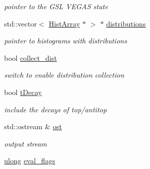 \begin{DoxyCompactItemize}
\begin{DoxyCompactList}\small\item\em pointer to the G\-S\-L V\-E\-G\-A\-S state \end{DoxyCompactList}\item 
\hypertarget{classintegrand__par_a64a87fc85afba50f419677de01b2c44c}{std\-::vector$<$ \hyperlink{classHistArray}{Hist\-Array} $\ast$ $>$ $\ast$ \hyperlink{classintegrand__par_a64a87fc85afba50f419677de01b2c44c}{distributions}}\label{classintegrand__par_a64a87fc85afba50f419677de01b2c44c}

\begin{DoxyCompactList}\small\item\em pointer to histograms with distributions \end{DoxyCompactList}\item 
\hypertarget{classintegrand__par_a2227f484c28e54b55769b2fe6911a782}{bool \hyperlink{classintegrand__par_a2227f484c28e54b55769b2fe6911a782}{collect\-\_\-dist}}\label{classintegrand__par_a2227f484c28e54b55769b2fe6911a782}

\begin{DoxyCompactList}\small\item\em switch to enable distribution collection \end{DoxyCompactList}\item 
\hypertarget{classintegrand__par_a725bfa73c797c38c5575594d0ff53eb6}{bool \hyperlink{classintegrand__par_a725bfa73c797c38c5575594d0ff53eb6}{t\-Decay}}\label{classintegrand__par_a725bfa73c797c38c5575594d0ff53eb6}

\begin{DoxyCompactList}\small\item\em include the decays of top/antitop \end{DoxyCompactList}\item 
\hypertarget{classintegrand__par_ab817e73577da97cd660ad01761521d3b}{std\-::ostream \& \hyperlink{classintegrand__par_ab817e73577da97cd660ad01761521d3b}{ost}}\label{classintegrand__par_ab817e73577da97cd660ad01761521d3b}

\begin{DoxyCompactList}\small\item\em output stream \end{DoxyCompactList}\item 
\hypertarget{classintegrand__par_adb701c9d21e3b412032dca85ebcde090}{\hyperlink{Global_8h_a1398ea0e48e059bf4db2f4bcd7eb31fa}{ulong} \hyperlink{classintegrand__par_adb701c9d21e3b412032dca85ebcde090}{eval\-\_\-flags}}\label{classintegrand__par_adb701c9d21e3b412032dca85ebcde090}


\end{DoxyCompactItemize}
